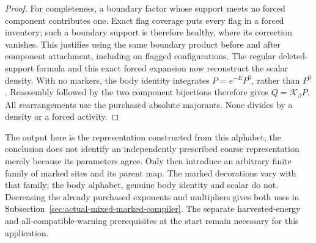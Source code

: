 \begin{proof}
For completeness, a boundary factor whose support meets no forced
component contributes one. Exact flag coverage puts every flag in a
forced inventory; such a boundary support is therefore healthy, where
its correction vanishes. This justifies using the same boundary
product before and after component attachment, including on flagged
configurations. The regular deleted-support formula and this exact
forced expansion now reconstruct the scalar density. With no markers,
the body identity integrates $P=e^{-E}P^0$, rather than $P^0$.
Reassembly followed by the two component bijections therefore gives
$Q=\mathcal K_\beta P$. All rearrangements use the purchased absolute
majorants. None divides by a density or a forced activity.
\end{proof}

The output here is the representation constructed from this alphabet;
the conclusion does not identify an independently prescribed coarse
representation merely because its parameters agree.
Only then introduce an arbitrary finite family of marked sites
and its parent map. The marked decorations vary with that family;
the body alphabet, genuine body identity and scalar do not.
Decreasing the already purchased exponents and multipliers gives
both uses in Subsection~\ref{sec:actual-mixed-marked-compiler}.
The separate harvested-energy and all-compatible-warning
prerequisites at the start remain necessary for this application.
